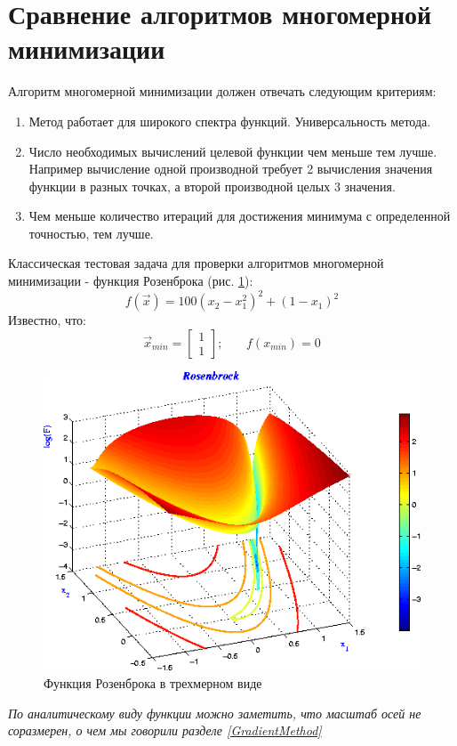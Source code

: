 \section{Сравнение алгоритмов многомерной минимизации}
Алгоритм многомерной минимизации должен отвечать следующим критериям:
\begin{enumerate}
    \item Метод работает для широкого спектра функций. Универсальность метода.
    \item Число необходимых вычислений целевой функции чем меньше тем лучше. Например вычисление одной производной требует 2 вычисления значения функции в разных точках, а второй производной целых 3 значения.
    \item Чем меньше количество итераций для достижения минимума с определенной точностью, тем лучше.
\end{enumerate}

Классическая тестовая задача для проверки алгоритмов многомерной минимизации - функция Розенброка (рис. \ref{fig:Rosenbrock}):
\begin{equation*}
    f(\vec x) = 100 (x_2 - x_1^2)^2 +(1-x_1)^2
\end{equation*}
Известно, что:
\begin{equation}
    \vec x_{min} = \left[\begin{array}{cc}
        1 \\
        1 
    \end{array}\right]\text{;} \qquad f(x_{min}) = 0
\end{equation}
\begin{figure}
    \centering
    \includegraphics[scale = 0.7]{Pictures/Rosenbrock.png}
    \caption{Функция Розенброка в трехмерном виде}
    \label{fig:Rosenbrock}
\end{figure}
\textit{По аналитическому виду функции можно заметить, что масштаб осей не соразмерен, о чем мы говорили разделе \ref{GradientMethod}}


